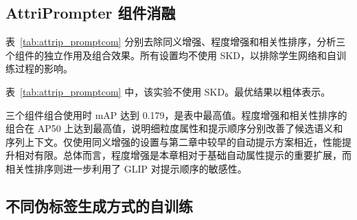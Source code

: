 \subsection{AttriPrompter 组件消融}

表~\ref{tab:attrip_promptcom} 分别去除同义增强、程度增强和相关性排序，分析三个组件的独立作用及组合效果。所有设置均不使用 SKD，以排除学生网络和自训练过程的影响。

\begin{table}[t]
\caption{AttriPrompter 组件消融}
\label{tab:attrip_promptcom}
\begin{center}
\end{center}
\vskip -0.15in
\end{table}
表~\ref{tab:attrip_promptcom} 中，该实验不使用 SKD。最优结果以粗体表示。


三个组件组合使用时 mAP 达到 0.179，是表中最高值。程度增强和相关性排序的组合在 AP50 上达到最高值，说明细粒度属性和提示顺序分别改善了候选语义和序列上下文。仅使用同义增强的设置与第二章中较早的自动提示方案相近，性能提升相对有限。总体而言，程度增强是本章相对于基础自动属性提示的重要扩展，而相关性排序则进一步利用了 GLIP 对提示顺序的敏感性。

\subsection{不同伪标签生成方式的自训练}

